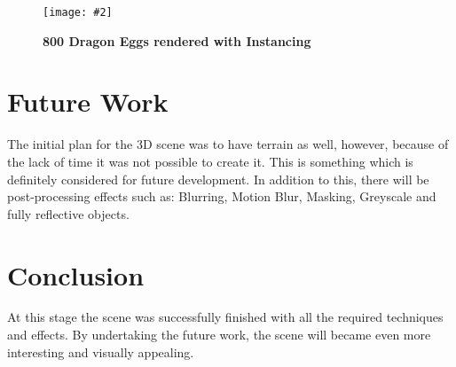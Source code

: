 \documentclass[10pt, a4paper]{article}
\newcommand{\figuremacro}[5]{
    \begin{figure}[#1]
        \centering
        \texttt{[image: \#2]}
        \caption[#3]{\textbf{#3}#4}
        \label{fig:#2}
    \end{figure}
}
\begin{document}
	\figuremacro{h}{instancing}{800 Dragon Eggs rendered with Instancing}{ }{1.0}
	\section{Future Work}
	The initial plan for the 3D scene was to have terrain as well, however, because of the lack of time it was not possible to create it. This is something which is definitely considered  for future development. In addition to this, there will be post-processing effects such as: Blurring, Motion Blur, Masking, Greyscale and fully reflective objects. 
	\section{Conclusion}
	At this stage the scene was successfully finished with all the required techniques and effects. By undertaking the future work, the scene will became even more interesting and visually appealing.	


		
\end{document}
